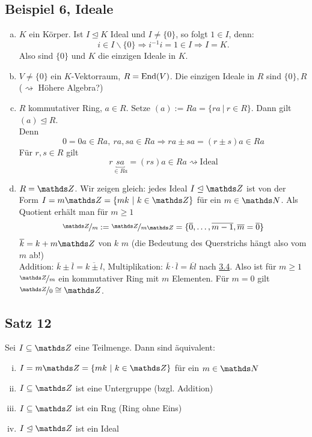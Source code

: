 \subsection{Beispiel 6, Ideale}
\label{sub:bsp_ideale}
\begin{enumerate}[(a)]
	\item $K$ ein Körper. 
	Ist $I\trianglelefteq K$ Ideal und $I\neq \{0\}$, so folgt $1\in I$, denn:
	\[
	i\in I\backslash\{0\}\Rightarrow i^{-1}i=1\in I \Rightarrow I=K.
	\]
	Also sind $\{0\}$ und $K$ die einzigen Ideale in $K$.
	\item $V\neq \{0\}$ ein $K$-Vektorraum, $R=\operatorname{End}(V)$. 
	Die einzigen Ideale in $R$ sind $\{0\},R$ ($\rightsquigarrow$ Höhere Algebra?)
	\item $R$ kommutativer Ring, $a\in R$. 
	Setze $(a):=Ra=\{ra~|~r\in R\}$. 
	Dann gilt $(a)\trianglelefteq R$. \\%
	Denn 
	\[
	0=0a\in Ra,~ra,sa\in Ra\Rightarrow ra\pm sa=(r\pm s)a\in Ra
	\]
	Für $r,s\in R$ gilt
	\[
	r\underbracket{sa}_{\in Ra}=(rs)a\in Ra \rightsquigarrow \text{Ideal}
	\]
	\item $R=\Z$. Wir zeigen gleich: jedes Ideal $I\trianglelefteq \Z$ ist von der Form $I=m\Z=\{mk~|~k\in \Z\}$ für ein $m\in \N$. 
	Als Quotient erhält man für $m\ge 1$
	\[
	\nicefrac{\Z}{m}:=\nicefrac{\Z}{m\Z}=\{\overline{0},\dots,\overline{m-1},\overline{m}=\overline{0} \}
	\]
	$\overline{k}=k+m\Z$  von $k$  $m$ (die Bedeutung des Querstrichs hängt also vom $m$ ab!)\\
	Addition: 
	$\overline{k}\pm\overline{l}=\overline{k\pm l}$, 
	Multiplikation: 
	$\overline{k}\cdot\overline{l}=\overline{kl}$ nach \hyperref[sub:homomor_ideale]{3.4}. 
	Also ist für $m\ge 1$ $\nicefrac{\Z}{m}$ ein kommutativer Ring mit $m$ Elementen.
	Für $m=0$ gilt $\nicefrac{\Z}{0}\cong \Z$.
\end{enumerate}


\subsection{Satz 12}
\label{sub:satz_12}
Sei $I\subseteq \Z$ eine Teilmenge. Dann sind äquivalent:
\begin{enumerate}[(i)]
	\item $I=m\Z=\{mk~|~k\in\Z\}$ für ein $m\in \N$
	\item $I\subseteq \Z$ ist eine Untergruppe (bzgl. Addition)
	\item $I\subseteq \Z$ ist ein Rng (Ring ohne Eins)
	\item $I\trianglelefteq \Z$ ist ein Ideal
\end{enumerate}

